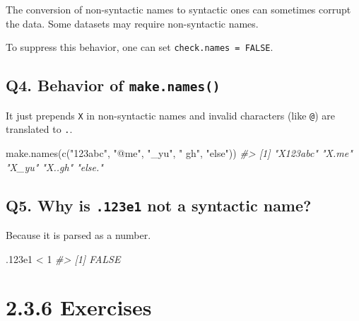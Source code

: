 \documentclass[
]{book}
\newenvironment{Shaded}{\begin{snugshade}}{\end{snugshade}}
\newcommand{\CommentTok}[1]{\textcolor[rgb]{0.56,0.35,0.01}{\textit{#1}}}
\newcommand{\DecValTok}[1]{\textcolor[rgb]{0.00,0.00,0.81}{#1}}
\newcommand{\FloatTok}[1]{\textcolor[rgb]{0.00,0.00,0.81}{#1}}
\newcommand{\FunctionTok}[1]{\textcolor[rgb]{0.00,0.00,0.00}{#1}}
\newcommand{\NormalTok}[1]{#1}
\newcommand{\SpecialCharTok}[1]{\textcolor[rgb]{0.00,0.00,0.00}{#1}}
\newcommand{\StringTok}[1]{\textcolor[rgb]{0.31,0.60,0.02}{#1}}
\begin{document}
The conversion of non-syntactic names to syntactic ones can sometimes corrupt the data. Some datasets may require non-syntactic names.

To suppress this behavior, one can set \texttt{check.names\ =\ FALSE}.

\hypertarget{q4.-behavior-of-make.names}{%
\subsection*{\texorpdfstring{Q4. Behavior of \texttt{make.names()}}{Q4. Behavior of make.names()}}\label{q4.-behavior-of-make.names}}

It just prepends \texttt{X} in non-syntactic names and invalid characters (like \texttt{@}) are translated to \texttt{.}.

\begin{Shaded}
\begin{Highlighting}[]
\FunctionTok{make.names}\NormalTok{(}\FunctionTok{c}\NormalTok{(}\StringTok{"123abc"}\NormalTok{, }\StringTok{"@me"}\NormalTok{, }\StringTok{"\_yu"}\NormalTok{, }\StringTok{"  gh"}\NormalTok{, }\StringTok{"else"}\NormalTok{))}
\CommentTok{\#\textgreater{} [1] "X123abc" "X.me"    "X\_yu"    "X..gh"   "else."}
\end{Highlighting}
\end{Shaded}

\hypertarget{q5.-why-is-.123e1-not-a-syntactic-name}{%
\subsection*{\texorpdfstring{Q5. Why is \texttt{.123e1} not a syntactic name?}{Q5. Why is .123e1 not a syntactic name?}}\label{q5.-why-is-.123e1-not-a-syntactic-name}}

Because it is parsed as a number.

\begin{Shaded}
\begin{Highlighting}[]
\NormalTok{.}\FloatTok{123e1} \SpecialCharTok{\textless{}} \DecValTok{1}
\CommentTok{\#\textgreater{} [1] FALSE}
\end{Highlighting}
\end{Shaded}

\hypertarget{exercises-1}{%
\section{2.3.6 Exercises}\label{exercises-1}}
\end{document}
